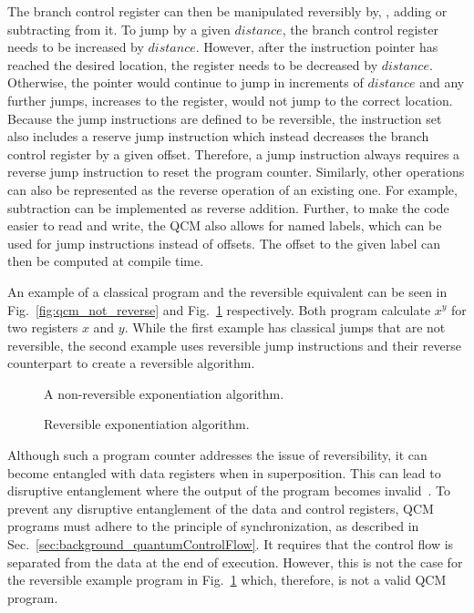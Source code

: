 The branch control register can then be manipulated reversibly by, \eg, adding or subtracting from it. To jump by a given $distance$, the branch control register needs to be increased by $distance$. However, after the instruction pointer has reached the desired location, the register needs to be decreased by $distance$. Otherwise, the pointer would continue to jump in increments of $distance$ and any further jumps, \ie increases to the register, would not jump to the correct location. Because the jump instructions are defined to be reversible, the instruction set also includes a reserve jump instruction which instead decreases the branch control register by a given offset. Therefore, a jump instruction always requires a reverse jump instruction to reset the program counter. Similarly, other operations can also be represented as the reverse operation of an existing one. For example, subtraction can be implemented as reverse addition. Further, to make the code easier to read and write, the QCM also allows for named labels, which can be used for jump instructions instead of offsets. The offset to the given label can then be computed at compile time. 

An example of a classical program and the reversible equivalent can be seen in Fig.~\ref{fig:qcm_not_reverse} and Fig.~\ref{fig:qcm_reverse} respectively. Both program calculate $x^y$ for two registers $x$ and $y$. While the first example has classical jumps that are not reversible, the second example uses reversible jump instructions and their reverse counterpart to create a reversible algorithm.

\begin{figure}[htp]
    \centering     
    \begin{minipage}{.40\textwidth}
        
        \caption{A non-reversible exponentiation algorithm.}
        \label{fig:qcm_not_reverse}
    \end{minipage}
    \hfill
    \begin{minipage}{.50\textwidth}
        
        \caption{Reversible exponentiation algorithm.}    
        \label{fig:qcm_reverse}
    \end{minipage}
\end{figure}

Although such a program counter addresses the issue of reversibility, it can become entangled with data registers when in superposition. This can lead to disruptive entanglement where the output of the program becomes invalid~\cite{YVC24}. To prevent any disruptive entanglement of the data and control registers, QCM programs must adhere to the principle of synchronization, as described in Sec.~\ref{sec:background_quantumControlFlow}. 
It requires that the control flow is separated from the data at the end of execution. However, this is not the case for the reversible example program in Fig.~\ref{fig:qcm_reverse} which, therefore, is not a valid QCM program.

